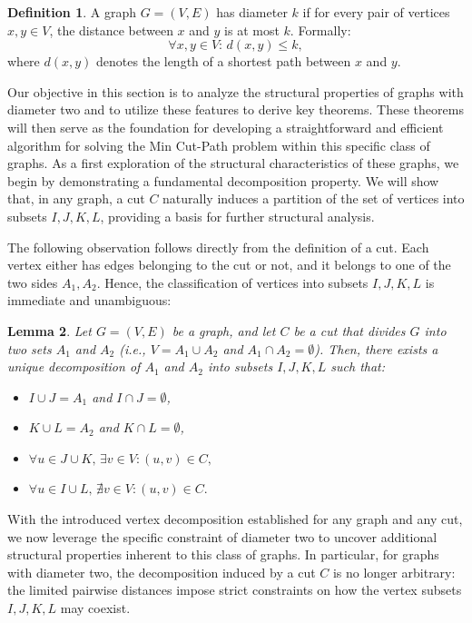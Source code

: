 \documentclass[journal ]{new-aiaa}
\numberwithin{equation}{section}
\theoremstyle{definition}
\newtheorem{definition}{Definition}[section]
\theoremstyle{plain}
\newtheorem{lemma}[definition]{Lemma}
\theoremstyle{remark}
\begin{document}
\begin{definition}
A graph $G = (V, E)$ has diameter $k$ if for every pair of vertices $x, y \in V$, the distance between $x$ and $y$ is at most $k$. Formally:
\[
\forall x, y \in V: \, d(x, y) \leq k,
\]
where $d(x, y)$ denotes the length of a shortest path between $x$ and $y$.

\end{definition}

Our objective in this section is to analyze the structural properties of graphs with diameter two and to utilize these features to derive key theorems. These theorems will then serve as the foundation for developing a straightforward and efficient algorithm for solving the Min Cut-Path problem within this specific class of graphs.  As a first exploration of the structural characteristics of these graphs, we begin by demonstrating a fundamental decomposition property.  We will show that, in any graph, a cut $C$ naturally induces a partition of the set of vertices into subsets $I, J, K, L$, providing a basis for further structural analysis.



The following observation follows directly from the definition of a cut.  
Each vertex either has edges belonging to the cut or not, and it belongs to one of the two sides \(A_1, A_2\).  
Hence, the classification of vertices into subsets \(I, J, K, L\) is immediate and unambiguous:

\begin{lemma}
\label{claim:cut_decomposition}
Let \(G = (V, E)\) be a graph, and let \(C\) be a cut that divides \(G\) into two sets \(A_1\) and \(A_2\) (i.e., \(V = A_1 \cup A_2\) and \(A_1 \cap A_2 = \emptyset\)).  
Then, there exists a unique decomposition of \(A_1\) and \(A_2\) into subsets \(I, J, K, L\) such that:
\begin{itemize}
    \item \(I \cup J = A_1\) and \(I \cap J = \emptyset\),
    \item \(K \cup L = A_2\) and \(K \cap L = \emptyset\),
    \item \(\forall u \in J \cup K, \, \exists v \in V: (u, v) \in C,\)
    \item \(\forall u \in I \cup L, \, \nexists v \in V: (u, v) \in C.\)
\end{itemize}
\end{lemma}


With the introduced vertex decomposition established for any graph and any cut, we now leverage the specific constraint of diameter two to uncover additional structural properties inherent to this class of graphs.  
In particular, for graphs with diameter two, the decomposition induced by a cut \(C\) is no longer arbitrary:  
the limited pairwise distances impose strict constraints on how the vertex subsets \(I, J, K, L\) may coexist.
\end{document}
